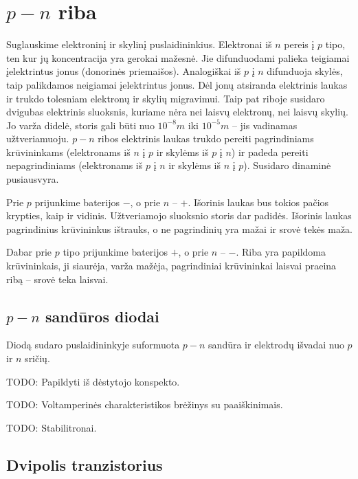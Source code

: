 \section{$p-n$ riba}

Suglauskime elektroninį ir skylinį puslaidininkius. Elektronai iš $n$
pereis į $p$ tipo, ten kur jų koncentracija yra gerokai mažesnė. Jie
difunduodami palieka teigiamai įelektrintus jonus (donorinės priemaišos).
Analogiškai iš $p$ į $n$ difunduoja skylės, taip palikdamos neigiamai
įelektrintus jonus. Dėl jonų atsiranda elektrinis laukas ir trukdo
tolesniam elektronų ir skylių migravimui. Taip pat riboje susidaro
dvigubas elektrinis sluoksnis, kuriame nėra nei laisvų elektronų, nei
laisvų skylių. Jo varža didelė, storis gali būti nuo $10^{-8}m$
iki $10^{-5}m$ – jis vadinamas užtveriamuoju. $p-n$ ribos elektrinis
laukas trukdo pereiti pagrindiniams krūvininkams (elektronams iš
$n$ į $p$ ir skylėms iš $p$ į $n$) ir padeda pereiti nepagrindiniams
(elektronams iš $p$ į $n$ ir skylėms iš $n$ į $p$). Susidaro dinaminė
pusiausvyra.

Prie $p$ prijunkime baterijos $-$, o prie $n$ – $+$. Išorinis laukas bus
tokios pačios krypties, kaip ir vidinis. Užtveriamojo sluoksnio storis
dar padidės. Išorinis laukas pagrindinius krūvininkus ištrauks, o
ne pagrindinių yra mažai ir srovė tekės maža.

Dabar prie $p$ tipo prijunkime baterijos $+$, o prie $n$ – $-$. Riba
yra papildoma krūvininkais, ji siaurėja, varža mažėja, pagrindiniai
krūvininkai laisvai praeina ribą – srovė teka laisvai.

\subsection{$p-n$ sandūros diodai}

\begin{defn}[Diodas]
  Diodą sudaro puslaidininkyje suformuota $p-n$ sandūra ir elektrodų
  išvadai nuo $p$ ir $n$ sričių.
\end{defn}

TODO: Papildyti iš dėstytojo konspekto.

TODO: Voltamperinės charakteristikos brėžinys su paaiškinimais.

TODO: Stabilitronai.

\subsection{Dvipolis tranzistorius}

